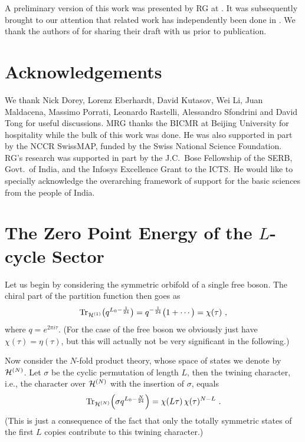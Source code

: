 \documentclass[12pt,a4paper]{article}
\begin{document}
 A preliminary version of this work was presented by RG at \cite{RG}. It was subsequently brought to our attention that related work has independently been done in \cite{GHKPR}. We thank the authors of  \cite{GHKPR} for sharing their draft with us prior to publication. 


\section*{Acknowledgements}

We thank Nick Dorey, Lorenz Eberhardt, David Kutasov, Wei Li, Juan Maldacena, Massimo Porrati, Leonardo Rastelli, Alessandro Sfondrini and David Tong for useful discussions. MRG thanks the BICMR at Beijing University for hospitality while the bulk of this work was done. He was also supported in part by the NCCR SwissMAP, funded by the Swiss National Science Foundation. RG's research was supported in part by the J.C.~Bose Fellowship of the SERB, Govt.~of India, and the Infosys Excellence Grant to the ICTS.  He would like to specially acknowledge the overarching framework of support for the basic sciences from the people of India.  

\appendix

\section{The Zero Point Energy of the $L$-cycle Sector}\label{app:ground}

Let us begin by considering the symmetric orbifold of a single free boson. The chiral part of the partition function then goes as 
\begin{equation}\label{onebos}
{\rm Tr}_{{\cal H}^{(1)}} \bigl( q^{L_0 - \frac{1}{24}} \bigr) =
q^{-\frac{1}{24}} \bigl( 1 + \cdots \bigr) = \chi(\tau) \ ,
\end{equation}
where $q=e^{2\pi i \tau}$. (For the case of the free boson we obviously just have $\chi(\tau) = \eta(\tau)$, but this will actually not be very significant in the following.) 

Now consider the $N$-fold product theory, whose
space of states we denote by ${\cal H}^{(N)}$. Let $\sigma$ be the cyclic permutation of length $L$, 
then the twining character, i.e., the character over ${\cal H}^{(N)}$ with the insertion of $\sigma$,
equals
\begin{equation}\label{twinedsector}
{\rm Tr}_{{\cal H}^{(N)}} \Bigl(\sigma q^{L_0 - \frac{N}{24}} \Bigr) = \chi(L\tau)\, \chi(\tau)^{N-L} \ . 
\end{equation}
(This is just a consequence of the fact that only the totally symmetric states of the first $L$ copies contribute to
this twining character.)
\end{document}
